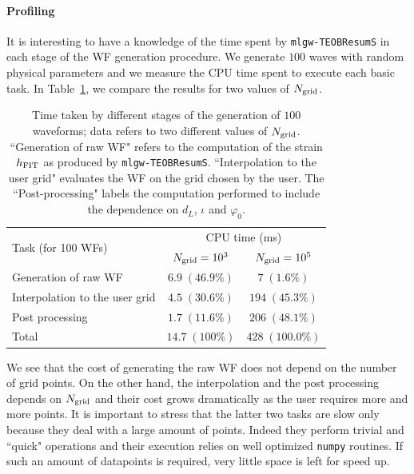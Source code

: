 \paragraph{Profiling}
It is interesting to have a knowledge of the time spent by \texttt{mlgw-TEOBResumS} 
in each stage of the WF generation procedure. We generate $100$ waves with random 
physical parameters and we measure the CPU time spent to execute each basic task.
In Table~\ref{tab:profiling}, we compare the results for two values of $N_{\rm grid}$.
\begin{table}
	\caption{
Time taken by different stages of the generation of $100$ waveforms; data refers to two different values of $N_{\rm grid}$.
``Generation of raw WF" refers to the computation of the strain $h_{\rm FIT}$ as produced by \texttt{mlgw-TEOBResumS}. 
``Interpolation to the user grid" evaluates the WF on the grid chosen by the user. 
The ``Post-processing" labels the computation performed to include the dependence on $d_L$, $\iota$ and $\varphi_0$.
}
	\label{tab:profiling}
	\def\arraystretch{1.5}
	\begin{ruledtabular}
	\begin{tabular}{ l c c }
		\multirow{2}{*}{Task (for 100 WFs)}& \multicolumn{2}{c}{CPU time (ms)}\\
			&$N_{\rm grid} = 10^3$	& $N_{\rm grid} = 10^5$\\
	\hline \hline
		 Generation of raw WF 			& $6.9 \; (46.9\%)$	& $7 \; (1.6\%)$ \\ 
	\hline
		 Interpolation to the user grid & $4.5 \; (30.6\%)$	& $194 \; (45.3\%)$ \\ 
	\hline
		 Post processing 				& $1.7 \; (11.6\%)$	& $206 \; (48.1\%)$ \\
	\hline
		 Total							& $14.7 \; (100\%)$ &  $428 \; (100.0\%)$ \\
	\end{tabular}
	\end{ruledtabular}
\end{table}
We see that the cost of generating the raw WF does not depend on the number of grid points. 
On the other hand, the interpolation and the post processing depends on $N_{\rm grid}$ and their 
cost grows dramatically as the user requires more and more points. It is important to stress that 
the latter two tasks are slow only because they deal with a large amount of points. Indeed they perform 
trivial and ``quick" operations and their execution relies on well optimized \texttt{numpy} routines.
If such an amount of datapoints is required, very little space is left for speed up.



